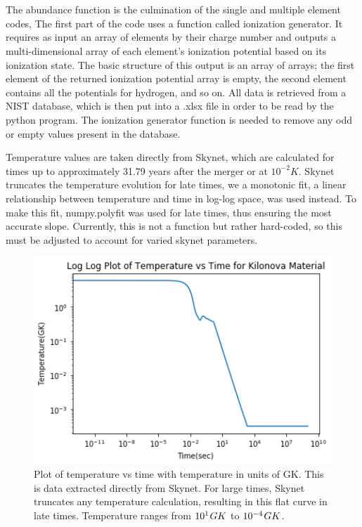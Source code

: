 \documentclass[11pt,a4paper]{article}
\begin{document}
\\\\
The abundance function is the culmination of the single and multiple element codes, The first part of the code uses a function called ionization generator. It requires as input an array of elements by their charge number and outputs a multi-dimensional array of each element's ionization potential based on its ionization state. The basic structure of this output is an array of arrays; the first element of the returned ionization potential array is empty, the second element contains all the potentials for hydrogen, and so on. All data is retrieved from a NIST database, which is then put into a .xlsx file in order to be read by the python program. The ionization generator function is needed to remove any odd or empty values present in the database.

Temperature values are taken directly from Skynet, which are calculated for times up to approximately 31.79 years after the merger or at $10^{-2} K$. Skynet truncates the temperature evolution for late times, we a monotonic fit, a linear relationship between temperature and time in log-log space, was used instead. To make this fit, numpy.polyfit was used for late times, thus ensuring the most accurate slope. Currently, this is not a function but rather hard-coded, so this must be adjusted to account for varied skynet parameters.

\begin{figure}[h!]
  \includegraphics[width=1\textwidth]{skynet_non_linear.png}
  \caption{Plot of temperature vs time with temperature in units of GK. This is data extracted directly from Skynet. For large times, Skynet truncates any temperature calculation, resulting in this flat curve in late times. Temperature ranges from $10^1 \hspace{.03 cm} GK$ to $10^{-4} \hspace{.03 cm} GK$.}
\end{figure}
\end{document}

